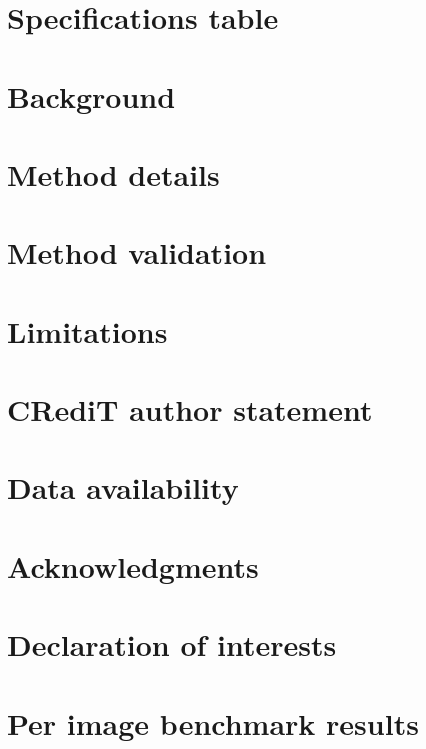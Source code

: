 \documentclass[preprint,12pt]{elsarticle}
\begin{document}


\section{Specifications table}


\section{Background}


\section{Method details}


\section{Method validation}


\section{Limitations}


\section{CRediT author statement}


\section{Data availability}


\section{Acknowledgments}


\section{Declaration of interests}


\appendix
\section{Per image benchmark results}



\end{document}
